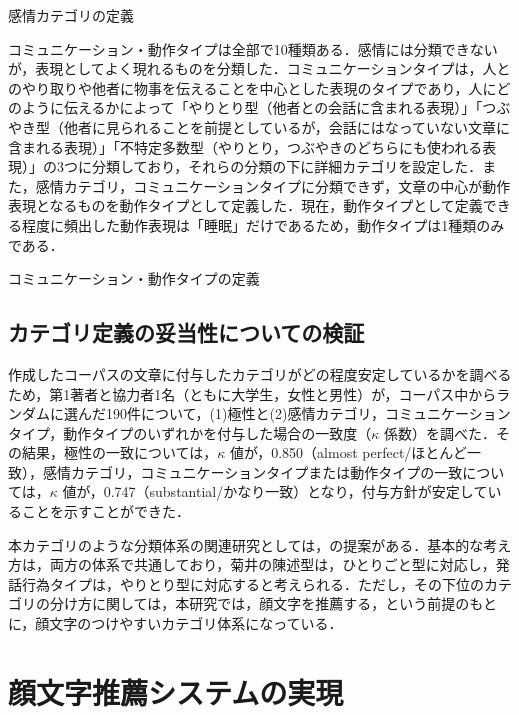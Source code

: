 \documentclass[japanese]{jnlp_1.4}
\begin{document}
\begin{table}[p]
\caption{感情カテゴリの定義}
\label{table:em}

\end{table}

コミュニケーション・動作タイプは全部で10種類ある．感情には分類できないが，表現としてよく現れるものを分類した．コミュニケーションタイプは，人とのやり取りや他者に物事を伝えることを中心とした表現のタイプであり，人にどのように伝えるかによって「やりとり型（他者との会話に含まれる表現）」「つぶやき型（他者に見られることを前提としているが，会話にはなっていない文章に含まれる表現）」「不特定多数型（やりとり，つぶやきのどちらにも使われる表現）」の3つに分類しており，それらの分類の下に詳細カテゴリを設定した．また，感情カテゴリ，コミュニケーションタイプに分類できず，文章の中心が動作表現となるものを動作タイプとして定義した．現在，動作タイプとして定義できる程度に頻出した動作表現は「睡眠」だけであるため，動作タイプは1種類のみである．

\begin{table}[t]
\caption{コミュニケーション・動作タイプの定義}
\label{table:com}

\end{table}


\subsection{カテゴリ定義の妥当性についての検証}
\label{subsec:kappa}

作成したコーパスの文章に付与したカテゴリがどの程度安定しているかを調べるため，第1著者と協力者1名（ともに大学生，女性と男性）が，コーパス中からランダムに選んだ190件について，(1)極性と(2)感情カテゴリ，コミュニケーションタイプ，動作タイプのいずれかを付与した場合の一致度（$\kappa$ 係数）を調べた．その結果，極性の一致については，$\kappa$ 値が，0.850（almost perfect/ほとんど一致\cite{landis1977}），感情カテゴリ，コミュニケーションタイプまたは動作タイプの一致については，$\kappa$ 値が，0.747（substantial/かなり一致\cite{landis1977}）となり，付与方針が安定していることを示すことができた．

本カテゴリのような分類体系の関連研究としては，の提案がある．基本的な考え方は，両方の体系で共通しており，菊井の陳述型は，ひとりごと型に対応し，発話行為タイプは，やりとり型に対応すると考えられる．ただし，その下位のカテゴリの分け方に関しては，本研究では，顔文字を推薦する，という前提のもとに，顔文字のつけやすいカテゴリ体系になっている．


\section{顔文字推薦システムの実現}
\label{sec:implementation}
\end{document}

